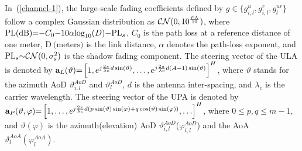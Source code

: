 \documentclass[12pt, draftclsnofoot, onecolumn]{IEEEtran}
\begin{document}
\noindent In~(\ref{channel-1}), the large-scale fading coefficients defined by  $g \in \{g^u_{i,l},g^{r}_{i,l},g^{ur}_{l}\}$ follow a complex Gaussian distribution as ${\cal CN}(0, 10^{\frac{PL}{10}})$, where $\text{PL(dB)} {\rm} {\rm =}  {\rm -}C_0{\rm -10 \alpha }{\rm log}_{10}({D}){\rm -}{\rm PL}_s$, $C_0$ is the path loss at a reference distance of one meter, $\text{D}\ \text{(meters)}$ is the link distance, $\alpha$ denotes the path-loss exponent, and $\text{PL}_s {\rm \sim} {\cal CN}(0, \sigma_s^2)$ is the shadow fading component. The steering vector of the ULA is denoted by $\mathbf{a}_{L}(\vartheta){\rm =}\left[1, e^{j \frac{2 \pi}{\lambda c} d \sin (\vartheta)}, \ldots, e^{j \frac{2 \pi}{\lambda c} d(A-1) \sin (\vartheta)}\right]^{H}$, where $\vartheta$ stands for the azimuth AoD $\vartheta_{i,l}^{AoD}$ and $ \vartheta_{l}^{AoD}$, $d$ is the antenna inter-spacing, and $\lambda_c$ is the carrier wavelength. The steering vector of the UPA is denoted by $\mathbf{a}_{P}(\vartheta, \varphi){\rm =}\left[1, \ldots, e^{j \frac{2 \pi}{\lambda c} d(p \sin (\vartheta) \sin (\varphi)+q \cos (\vartheta) \sin (\varphi))}, \ldots\right]^{H}$, where $0\leq {p,q}\leq m-1$, and $\vartheta(\varphi)$ is the azimuth(elevation) AoD $\vartheta_{i,l}^{AoD}$($\varphi_{i,l}^{AoD}$) and the AoA $\vartheta_{l}^{AoA}(\varphi_{l}^{AoA})$.
\end{document}
